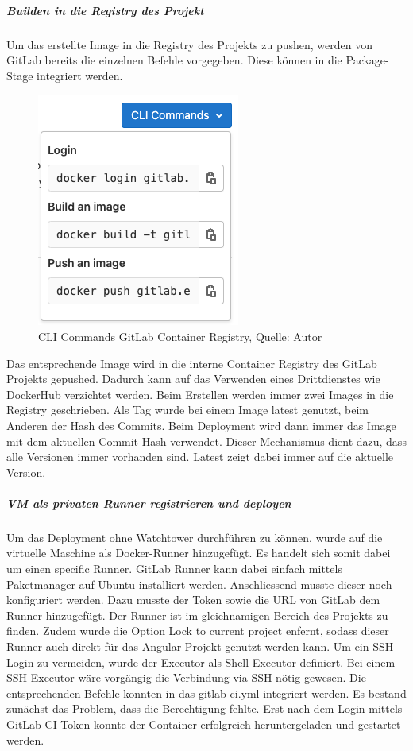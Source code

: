 \subparagraph{Builden in die Registry des Projekt}
Um das erstellte Image in die Registry des Projekts zu pushen, werden von GitLab bereits die einzelnen Befehle vorgegeben. Diese können in die Package-Stage integriert werden. 
\begin{figure}[H]
	\centering
	\includegraphics[scale=0.5]{images/gitLabRegistry.png}
	\caption[CLI Commands GitLab Container Registry]{CLI Commands GitLab Container Registry, Quelle: Autor}
\label{img: containerRegistryGitlab}
\end{figure}

Das entsprechende Image wird in die interne Container Registry des \gls{GitLab} Projekts gepushed. Dadurch kann auf das Verwenden eines Drittdienstes wie \gls{DockerHub} verzichtet werden. 
Beim Erstellen werden immer zwei Images in die Registry geschrieben. Als Tag wurde bei einem Image latest genutzt, beim Anderen der Hash des Commits. Beim Deployment wird dann immer das Image mit dem aktuellen Commit-Hash verwendet. Dieser Mechanismus dient dazu, dass alle Versionen immer vorhanden sind. Latest zeigt dabei immer auf die aktuelle Version. 

\subparagraph{VM als privaten Runner registrieren und deployen}
Um das Deployment ohne Watchtower durchführen zu können, wurde auf die virtuelle Maschine als Docker-Runner hinzugefügt. Es handelt sich somit dabei um einen specific Runner. 
\gls{GitLab} Runner kann dabei einfach mittels Paketmanager auf Ubuntu installiert werden. Anschliessend musste dieser noch konfiguriert werden. Dazu musste der Token sowie die URL von \gls{GitLab} dem Runner hinzugefügt. Der Runner ist im gleichnamigen Bereich des Projekts zu finden. Zudem wurde die Option \glqq Lock to current project\grqq{} enfernt, sodass dieser Runner auch direkt für das Angular Projekt genutzt werden kann. 
Um ein SSH-Login zu vermeiden, wurde der Executor als Shell-Executor definiert. Bei einem SSH-Executor wäre vorgängig die Verbindung via SSH nötig gewesen. 
Die entsprechenden Befehle konnten in das gitlab-ci.yml integriert werden. Es bestand zunächst das Problem, dass die Berechtigung fehlte. Erst nach dem Login mittels GitLab CI-Token konnte der Container erfolgreich heruntergeladen und gestartet werden. 

